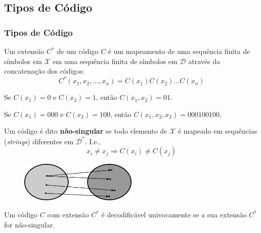 \subsection{Tipos de Código}
\begin{frame}[allowframebreaks]
  \frametitle{Tipos de Código}

  \begin{definition}[extensão]
  Um extensão $C^\ast$ de um código $C$ é um mapeamento de uma sequência finita 
  de símbolos em $\mathcal{X}$ em uma sequência finita de símbolos em $\mathcal{D}$ através da
  concatenação dos códigos: 
  	\begin{equation}
	C^\ast (x_1,x_2,\ldots,x_n) = C(x_1) C(x_2) \ldots C(x_n)
	\end{equation}
  \end{definition}
  \begin{example}
  Se $C(x_1)=0$ e $C(x_2)=1$, então $C(x_1,x_2) = 01$.
  \end{example}
  \begin{example}
  Se $C(x_1)=000$ e $C(x_2)=100$, então $C(x_1,x_2,x_2) = 000100100$.
  \end{example}

  \framebreak

  \begin{definition}
  Um código é dito \textbf{não-singular} se todo elemento de $\mathcal{X}$
  é mapeado em sequências (\textit{strings}) diferentes em $\mathcal{D}^\ast$. I.e.,
	\begin{equation}
	x_i \neq x_j \Rightarrow C(x_i) \neq C(x_j)
	\end{equation}
  \end{definition}

  \begin{figure}[h!]
  \centering
  \includegraphics[width=0.5\textwidth]{images/nonsingularmap2.pdf}
  \label{fig:nonsingularmap}
  \end{figure}

  \framebreak

  \begin{definition}
  Um código $C$ com extensão $C^\ast$ é decodificável univocamente se a sua extensão $C^\ast$ for não-singular.
  \end{definition}
  

\end{frame}
